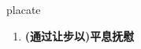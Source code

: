 
\begin{frame}
{\huge placate}
\begin{center}
\begin{enumerate}\Large
  \item \textbf{(通过让步以)平息抚慰}
\end{enumerate}
\end{center}
\end{frame}
